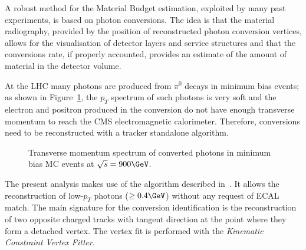 A robust method for the Material Budget estimation, exploited by many
past experiments, is based on photon conversions. The idea is that the
material radiography, provided by the position of reconstructed photon
conversion vertices, allows for the visualisation of detector layers
and service structures and that the conversions rate, if properly
accounted, provides an estimate of the amount of material in the
detector volume.

At the LHC many photons are produced from $\pi^0$ decays in minimum bias events; 
as shown in Figure~\ref{ptMC}, the $p_T$ spectrum of such photons is
very soft and the electron and positron produced in the conversion 
do not have enough transverse momentum to reach the CMS electromagnetic calorimeter.
Therefore, conversions need to be reconstructed with a tracker standalone algorithm.

\begin{figure}[!hbtp]
\centering
\caption{Transverse momentum spectrum of converted photons in minimum
  bias MC events at $\sqrt{s}=900\GeV$.}
\label{ptMC}
\end{figure}

The present analysis makes use of the algorithm described in~\cite{nancy}.
It allows the reconstruction of low-$p_T$ photons ($\geq 0.4\GeV$)
without any request of ECAL match. The main signature for the
conversion identification is the reconstruction of two opposite
charged tracks with tangent direction at the point where they form a
detached vertex. The vertex fit is performed with the \emph{Kinematic
  Constraint Vertex Fitter}.



